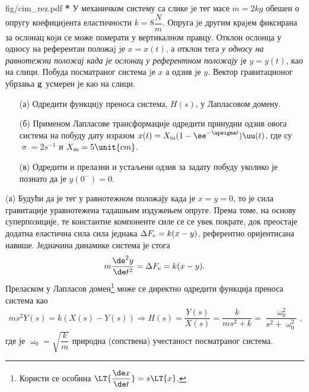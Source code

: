 \begin{slikaDesno}{fig/cim_rez.pdf}
    \textbf{\color{red}*}\PID
    У механичком систему са слике jе тег масе $m = 2\unit{kg}$ 
    обешен о опругу коефициjента
    еластичности $k = 8\unit{\dfrac Nm}$. 
    Опруга jе другим краjем фиксирана за ослонац коjи се може померати
    у вертикалном правцу. Отклон ослонца у односу на референтан положаj jе $x = x(t)$,
    а отклон тега \textit{у односу на равнотежни положај када је ослонац у 
    референтном положају} jе
    $y = y(t)$, као на слици. Побуда посматраног система jе $x$ а одзив jе $y$.
    Вектор гравитационог убрзања $\bf g$ усмерен је као на слици.
    \begin{enumerate}
        \item[(а)] Одредити функциjу преноса система, $H(s)$, у Лапласовом домену. 
    \end{enumerate}
\end{slikaDesno}
\begin{enumerate}
    \item[(б)] Применом Лапласове трансформације одредити
    принудни одзив овога система на побуду дату изразом
    $x(t) = X_{\rm m} (1 - \ee^{-\upsigma t}) \uu(t)$, где су 
    $\upsigma = 2 \unit{s^{-1}}$ и
    $X_{\rm m} = 5\unit{cm}$. 
    \item[(в)] Одредити и прелазни и устаљени одзив за задату побуду уколико је познато да је 
    $y(0^-) = 0$. 
\end{enumerate}

\RESENJE 
(а) Будући да је тег у равнотежном положају када је $x = y = 0$, то је сила гравитације уравнотежена тадашњим издужењем опруге. 
Према томе, на основу суперпозиције, те константне компоненте силе се се увек пократе, док преостаје додатна еластична сила
сила једнака $\Delta F_{\rm e} = k(x - y)$, референтно оријентисана навише. Једначина динамике система је стога 
\begin{equation}
    m \dfrac{\de^2 y}{\de t^2} = \Delta F_{\rm e} = k(x - y). 
\end{equation}
Преласком у Лапласов домен\footnote{Користи се особина $\LT{ \dfrac{\de x}{\de t} } = s \LT{x}$. } може се 
директно одредити функција преноса система као 
\begin{eqnarray}
    ms^2 Y(s) = k( X(s) - Y(s) ) 
    \Rightarrow
    H(s) = \dfrac{Y(s)}{X(s)} = \dfrac{k}{ms^2 + k} = \dfrac{\upomega_0^2}{s^2 + \upomega_0^2},
\end{eqnarray}
где је $\upomega_0 = \sqrt{\dfrac{k}{m}}$ природна (сопствена) учестаност посматраног система. 

